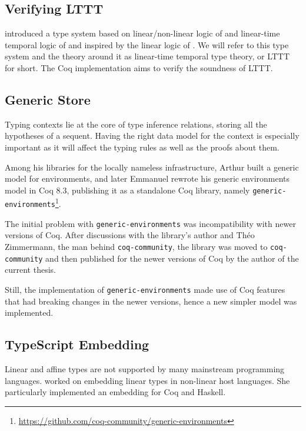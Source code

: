 \subsection{Verifying LTTT}

\cite{Paykin2016TheEO} introduced a type system based on linear/non-linear logic of \cite{DBLP:conf/csl/Benton94} and linear-time temporal logic of \cite{DBLP:conf/focs/Pnueli77} and inspired by the linear logic of \cite{DBLP:journals/tcs/Girard87}. We will refer to this type system and the theory around it as linear-time temporal type theory, or LTTT for short. The Coq implementation aims to verify the soundness of LTTT.

\subsection{Generic Store}

Typing contexts lie at the core of type inference relations, storing all the hypotheses of a sequent. Having the right data model for the context is especially important as it will affect the typing rules as well as the proofs about them.

Among his libraries for the locally nameless infrastructure, Arthur \cite{DBLP:journals/jar/Chargueraud12} built a generic model for environments, and later Emmanuel \cite{DBLP:journals/corr/abs-1112-1316} rewrote his generic environments model in Coq 8.3, publishing it as a standalone Coq library, namely \texttt{generic-environments}\footnote{\url{https://github.com/coq-community/generic-environments}}.

The initial problem with \texttt{generic-environments} was incompatibility with newer versions of Coq. After discussions with the library's author and Th\'eo Zimmermann, the man behind \texttt{coq-community}, the library was moved to \texttt{coq-community} and then published for the newer versions of Coq by the author of the current thesis.

Still, the implementation of \texttt{generic-environments} made use of Coq features that had breaking changes in the newer versions, hence a new simpler model was implemented.

\subsection{TypeScript Embedding}

Linear and affine types are not supported by many mainstream programming languages. \cite{JenniferPaykin2018} worked on embedding linear types in non-linear host languages. She particularly implemented an embedding for Coq and Haskell.

